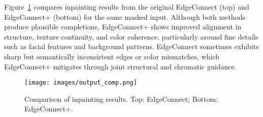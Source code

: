 Figure~\ref{fig:comparison_outputs} compares inpainting results from the original EdgeConnect (top) and EdgeConnect+ (bottom) for the same masked input. Although both methods produce plausible completions, EdgeConnect+ shows improved alignment in structure, texture continuity, and color coherence, particularly around fine details such as facial features and background patterns. EdgeConnect sometimes exhibits sharp but semantically inconsistent edges or color mismatches, which EdgeConnect+ mitigates through joint structural and chromatic guidance.

\begin{figure}[h]
\centering
\texttt{[image: images/output\_comp.png]}
\caption{Comparison of inpainting results. Top: EdgeConnect; Bottom: EdgeConnect+.}
\label{fig:comparison_outputs}
\end{figure}
